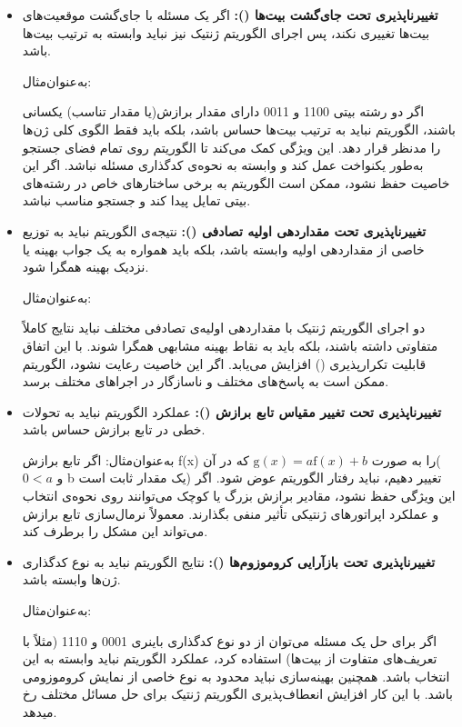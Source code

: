 \documentclass[12pt]{exam}
\begin{document}
\begin{questions}
	 \begin{itemize}
	 	\item \textbf{تغییرناپذیری تحت جای‌گشت بیت‌ها ():}
	 	اگر یک مسئله با جای‌گشت موقعیت‌های بیت‌ها تغییری نکند، پس اجرای الگوریتم ژنتیک نیز نباید وابسته به ترتیب بیت‌ها باشد.
	 	
	 	به‌عنوان‌مثال:
	 	
	 	اگر دو رشته بیتی 1100 و 0011  دارای مقدار برازش(یا مقدار تناسب) یکسانی باشند، الگوریتم نباید به ترتیب بیت‌ها حساس باشد، بلکه باید فقط الگوی کلی ژن‌ها را مدنظر قرار دهد. این ویژگی کمک می‌کند تا الگوریتم روی تمام فضای جستجو به‌طور یکنواخت عمل کند و وابسته به نحوه‌ی کدگذاری مسئله نباشد. اگر این خاصیت حفظ نشود، ممکن است الگوریتم به برخی ساختارهای خاص در رشته‌های بیتی تمایل پیدا کند و جستجو مناسب نباشد.
	 	\item \textbf{تغییرناپذیری تحت مقداردهی اولیه تصادفی ():}
	 	نتیجه‌ی الگوریتم نباید به توزیع خاصی از مقداردهی اولیه وابسته باشد، بلکه باید همواره به یک جواب بهینه یا نزدیک بهینه همگرا شود.
	 	
	 	به‌عنوان‌مثال:
	 	
	 	دو اجرای الگوریتم ژنتیک با مقداردهی اولیه‌ی تصادفی مختلف نباید نتایج کاملاً متفاوتی داشته باشند، بلکه باید به نقاط بهینه مشابهی همگرا شوند. با این اتفاق قابلیت تکرارپذیری 
	 	() افزایش می‌یابد. اگر این خاصیت رعایت نشود، الگوریتم ممکن است به پاسخ‌های مختلف و ناسازگار در اجراهای مختلف برسد.
	 	
	 	\item \textbf{تغییرناپذیری تحت تغییر مقیاس تابع برازش ():}
	 	عملکرد الگوریتم نباید به تحولات خطی در تابع برازش حساس باشد.
	 	
	 	به‌عنوان‌مثال:
	 	اگر تابع برازش f(x) را به صورت
	 		$\mathrm{g} (x) = a \mathrm{f} (x) + b $
	 	که در آن($0<a$ و b  یک مقدار ثابت است) تغییر دهیم، نباید رفتار الگوریتم عوض شود. اگر این ویژگی حفظ نشود، مقادیر برازش بزرگ یا کوچک می‌توانند روی نحوه‌ی انتخاب و عملکرد اپراتورهای ژنتیکی تأثیر منفی بگذارند. معمولاً نرمال‌سازی تابع برازش می‌تواند این مشکل را برطرف کند.
	 	
	 	\item \textbf{تغییرناپذیری تحت بازآرایی کروموزوم‌ها ():}
	 	نتایج الگوریتم نباید به نوع کدگذاری ژن‌ها وابسته باشد.
	 	
	 	به‌عنوان‌مثال:
	 	
	 	اگر برای حل یک مسئله می‌توان از دو نوع کدگذاری باینری 0001  و 1110 (مثلاً با تعریف‌های متفاوت از بیت‌ها) استفاده کرد، عملکرد الگوریتم نباید وابسته به این انتخاب باشد. همچنین بهینه‌سازی نباید محدود به نوع خاصی از نمایش کروموزومی باشد. با این کار افزایش انعطاف‌پذیری الگوریتم ژنتیک برای حل مسائل مختلف رخ میدهد.
	 	

\end{itemize}
\end{questions}
\end{document}
